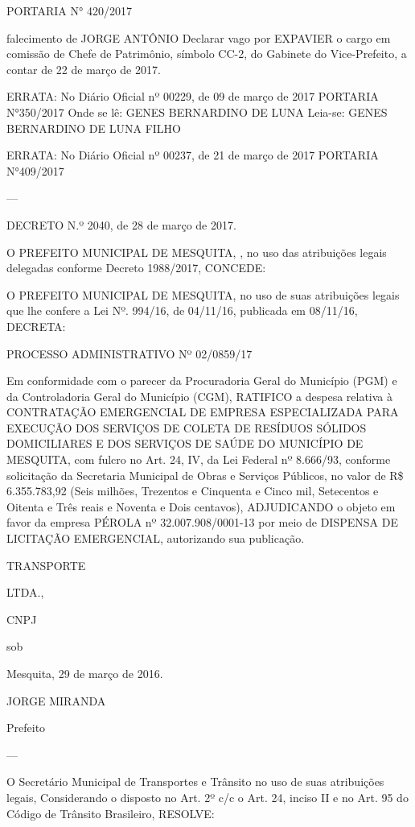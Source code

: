 \documentclass{doliberto}
\begin{document}
PORTARIA N° 420/2017 

falecimento  de  JORGE  ANTÔNIO 
Declarar  vago  por 
EXPAVIER o cargo em comissão de Chefe de Patrimônio, 
símbolo  CC-2,  do  Gabinete  do  Vice-Prefeito,  a  contar  de 
22 de março de 2017. 

ERRATA: 
No Diário Oficial nº 00229, de 09 de março de 2017 
PORTARIA N°350/2017 
Onde se lê: 
GENES BERNARDINO DE LUNA 
Leia-se: 
GENES BERNARDINO DE LUNA FILHO 
 
ERRATA: 
No Diário Oficial nº 00237, de 21 de março de 2017 
PORTARIA N°409/2017 

---

DECRETO N.º 2040, de 28 de março de 2017. 

O  PREFEITO  MUNICIPAL  DE  MESQUITA,  ,  no  uso  das 
atribuições legais delegadas conforme Decreto 1988/2017, 
CONCEDE:  

O  PREFEITO  MUNICIPAL  DE  MESQUITA,  no  uso  de  suas 
atribuições  legais  que  lhe  confere  a  Lei  Nº.  994/16,  de 
04/11/16, publicada em 08/11/16, DECRETA: 

PROCESSO ADMINISTRATIVO Nº 02/0859/17 

Em conformidade com o parecer da Procuradoria Geral do 
Município  (PGM)  e  da  Controladoria  Geral  do  Município 
(CGM),  RATIFICO  a  despesa  relativa  à  CONTRATAÇÃO 
EMERGENCIAL  DE  EMPRESA  ESPECIALIZADA  PARA 
EXECUÇÃO  DOS  SERVIÇOS  DE  COLETA  DE  RESÍDUOS 
SÓLIDOS  DOMICILIARES  E  DOS  SERVIÇOS  DE  SAÚDE  DO 
MUNICÍPIO DE MESQUITA, com fulcro no Art. 24, IV, da Lei 
Federal  nº  8.666/93,  conforme  solicitação  da  Secretaria 
Municipal  de  Obras  e  Serviços  Públicos,  no  valor  de  R\$ 
6.355.783,92 (Seis milhões, Trezentos e Cinquenta e Cinco 
mil,  Setecentos  e  Oitenta  e  Três  reais  e  Noventa  e  Dois 
centavos),  ADJUDICANDO  o  objeto  em  favor  da  empresa 
PÉROLA 
nº 
32.007.908/0001-13 por meio de DISPENSA DE LICITAÇÃO 
EMERGENCIAL, autorizando sua publicação. 

TRANSPORTE 

LTDA., 

CNPJ 

sob 

Mesquita, 29 de março de 2016. 

JORGE MIRANDA 

Prefeito 

---

O Secretário Municipal de Transportes e Trânsito no uso de 
suas atribuições legais,  
Considerando o disposto no Art. 2º c/c o Art. 24, inciso II e 
no Art. 95 do Código de Trânsito Brasileiro,  
RESOLVE:  
 
\end{document}
